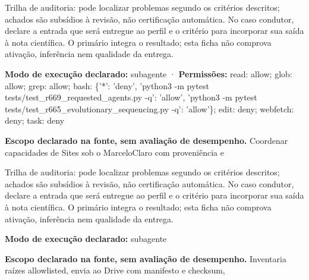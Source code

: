 \begin{funcao}
Trilha de auditoria: pode localizar problemas segundo os critérios descritos; achados são subsídios à revisão, não certificação automática. No caso condutor, declare a entrada que será entregue ao perfil e o critério para incorporar sua saída à nota científica. O primário integra o resultado; esta ficha não comprova ativação, inferência nem qualidade da entrega.
\end{funcao}

\begin{arquitetura}
\textbf{Modo de execução declarado:} subagente · \textbf{Permissões:} read: allow; glob: allow; grep: allow; bash: \{'*': 'deny', 'python3 -m pytest tests/test\_r669\_requested\_agents.py -q': 'allow', 'python3 -m pytest tests/test\_r665\_evolutionary\_sequencing.py -q': 'allow'\}; edit: deny; webfetch: deny; task: deny
\end{arquitetura}


\begin{descricao}
\textbf{Escopo declarado na fonte, sem avaliação de desempenho.}
Coordenar capacidades de Sites sob o MarceloClaro com proveniência e
\end{descricao}

\begin{funcao}
Trilha de auditoria: pode localizar problemas segundo os critérios descritos; achados são subsídios à revisão, não certificação automática. No caso condutor, declare a entrada que será entregue ao perfil e o critério para incorporar sua saída à nota científica. O primário integra o resultado; esta ficha não comprova ativação, inferência nem qualidade da entrega.
\end{funcao}

\begin{arquitetura}
\textbf{Modo de execução declarado:} subagente
\end{arquitetura}


\begin{descricao}
\textbf{Escopo declarado na fonte, sem avaliação de desempenho.}
Inventaria raízes allowlisted, envia ao Drive com manifesto e checksum,
\end{descricao}

